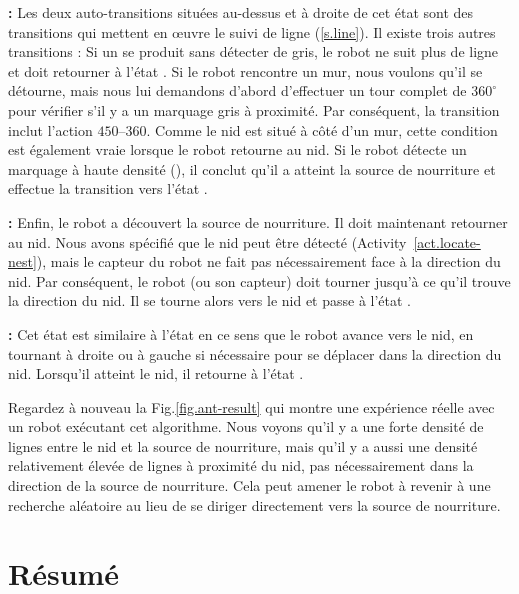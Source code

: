 \noindent\textbf{:} Les deux auto-transitions situées au-dessus et à droite de cet état sont des transitions qui mettent en œuvre le suivi de ligne (\ref{s.line}). Il existe trois autres transitions : Si un  se produit sans détecter de gris, le robot ne suit plus de ligne et doit retourner à l'état . Si le robot rencontre un mur, nous voulons qu'il se détourne, mais nous lui demandons d'abord d'effectuer un tour complet de $360^\circ$ pour vérifier s'il y a un marquage gris à proximité. Par conséquent, la transition inclut l'action  $450$--$360$. Comme le nid est situé à côté d'un mur, cette condition est également vraie lorsque le robot retourne au nid. Si le robot détecte un marquage à haute densité (), il conclut qu'il a atteint la source de nourriture et effectue la transition vers l'état .

\smallskip

\noindent\textbf{:} Enfin, le robot a découvert la source de nourriture. Il doit maintenant retourner au nid. Nous avons spécifié que le nid peut être détecté (Activity~\ref{act.locate-nest}), mais le capteur du robot ne fait pas nécessairement face à la direction du nid. Par conséquent, le robot (ou son capteur) doit tourner jusqu'à ce qu'il trouve la direction du nid. Il se tourne alors vers le nid et passe à l'état .

\smallskip

\noindent\textbf{:} Cet état est similaire à l'état  en ce sens que le robot avance vers le nid, en tournant à droite ou à gauche si nécessaire pour se déplacer dans la direction du nid. Lorsqu'il atteint le nid, il retourne à l'état .

\smallskip

Regardez à nouveau la Fig.\ref{fig.ant-result} qui montre une expérience réelle avec un robot exécutant cet algorithme. Nous voyons qu'il y a une forte densité de lignes entre le nid et la source de nourriture, mais qu'il y a aussi une densité relativement élevée de lignes à proximité du nid, pas nécessairement dans la direction de la source de nourriture. Cela peut amener le robot à revenir à une recherche aléatoire au lieu de se diriger directement vers la source de nourriture.

\section{Résumé}

